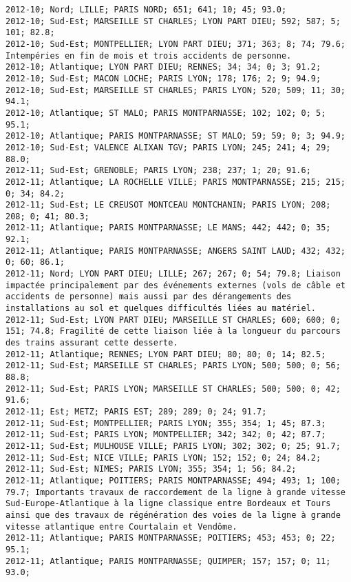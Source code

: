 \documentclass{article}
\begin{document}
\begin{Verbatim}[commandchars=\\\{\}]
2012-10; Nord; LILLE; PARIS NORD; 651; 641; 10; 45; 93.0; 
2012-10; Sud-Est; MARSEILLE ST CHARLES; LYON PART DIEU; 592; 587; 5; 101; 82.8; 
2012-10; Sud-Est; MONTPELLIER; LYON PART DIEU; 371; 363; 8; 74; 79.6; Intempéries en fin de mois et trois accidents de personne.
2012-10; Atlantique; LYON PART DIEU; RENNES; 34; 34; 0; 3; 91.2; 
2012-10; Sud-Est; MACON LOCHE; PARIS LYON; 178; 176; 2; 9; 94.9; 
2012-10; Sud-Est; MARSEILLE ST CHARLES; PARIS LYON; 520; 509; 11; 30; 94.1; 
2012-10; Atlantique; ST MALO; PARIS MONTPARNASSE; 102; 102; 0; 5; 95.1; 
2012-10; Atlantique; PARIS MONTPARNASSE; ST MALO; 59; 59; 0; 3; 94.9; 
2012-10; Sud-Est; VALENCE ALIXAN TGV; PARIS LYON; 245; 241; 4; 29; 88.0; 
2012-11; Sud-Est; GRENOBLE; PARIS LYON; 238; 237; 1; 20; 91.6; 
2012-11; Atlantique; LA ROCHELLE VILLE; PARIS MONTPARNASSE; 215; 215; 0; 34; 84.2; 
2012-11; Sud-Est; LE CREUSOT MONTCEAU MONTCHANIN; PARIS LYON; 208; 208; 0; 41; 80.3; 
2012-11; Atlantique; PARIS MONTPARNASSE; LE MANS; 442; 442; 0; 35; 92.1; 
2012-11; Atlantique; PARIS MONTPARNASSE; ANGERS SAINT LAUD; 432; 432; 0; 60; 86.1; 
2012-11; Nord; LYON PART DIEU; LILLE; 267; 267; 0; 54; 79.8; Liaison impactée principalement par des événements externes (vols de câble et accidents de personne) mais aussi par des dérangements des installations au sol et quelques difficultés liées au matériel.
2012-11; Sud-Est; LYON PART DIEU; MARSEILLE ST CHARLES; 600; 600; 0; 151; 74.8; Fragilité de cette liaison liée à la longueur du parcours des trains assurant cette desserte.
2012-11; Atlantique; RENNES; LYON PART DIEU; 80; 80; 0; 14; 82.5; 
2012-11; Sud-Est; MARSEILLE ST CHARLES; PARIS LYON; 500; 500; 0; 56; 88.8; 
2012-11; Sud-Est; PARIS LYON; MARSEILLE ST CHARLES; 500; 500; 0; 42; 91.6; 
2012-11; Est; METZ; PARIS EST; 289; 289; 0; 24; 91.7; 
2012-11; Sud-Est; MONTPELLIER; PARIS LYON; 355; 354; 1; 45; 87.3; 
2012-11; Sud-Est; PARIS LYON; MONTPELLIER; 342; 342; 0; 42; 87.7; 
2012-11; Sud-Est; MULHOUSE VILLE; PARIS LYON; 302; 302; 0; 25; 91.7; 
2012-11; Sud-Est; NICE VILLE; PARIS LYON; 152; 152; 0; 24; 84.2; 
2012-11; Sud-Est; NIMES; PARIS LYON; 355; 354; 1; 56; 84.2; 
2012-11; Atlantique; POITIERS; PARIS MONTPARNASSE; 494; 493; 1; 100; 79.7; Importants travaux de raccordement de la ligne à grande vitesse Sud-Europe-Atlantique à la ligne classique entre Bordeaux et Tours ainsi que des travaux de régénération des voies de la ligne à grande vitesse atlantique entre Courtalain et Vendôme.
2012-11; Atlantique; PARIS MONTPARNASSE; POITIERS; 453; 453; 0; 22; 95.1; 
2012-11; Atlantique; PARIS MONTPARNASSE; QUIMPER; 157; 157; 0; 11; 93.0; 

\end{Verbatim}
\end{document}
